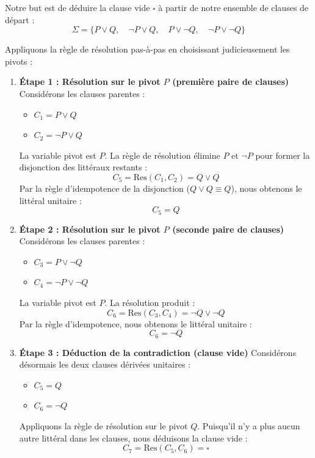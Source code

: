 \documentclass[11pt,a4paper]{article}
\begin{document}
Notre but est de déduire la clause vide \(\square\) à partir de notre
ensemble de clauses de départ :
\[\Sigma = \{ P \lor Q, \quad \neg P \lor Q, \quad P \lor \neg Q, \quad \neg P \lor \neg Q \}\]

Appliquons la règle de résolution pas-à-pas en choisissant
judicieusement les pivots :

\begin{enumerate}
\def\labelenumi{\arabic{enumi}.}
\item
  \textbf{Étape 1 : Résolution sur le pivot \(P\) (première paire de
  clauses)} Considérons les clauses parentes :

  \begin{itemize}
  \tightlist
  \item
    \(C_1 = P \lor Q\)
  \item
    \(C_2 = \neg P \lor Q\)
  \end{itemize}

  La variable pivot est \(P\). La règle de résolution élimine \(P\) et
  \(\neg P\) pour former la disjonction des littéraux restants :
  \[C_5 = \text{Res}(C_1, C_2) = Q \lor Q\] Par la règle d'idempotence
  de la disjonction (\(Q \lor Q \equiv Q\)), nous obtenons le littéral
  unitaire : \[C_5 = Q\]
\item
  \textbf{Étape 2 : Résolution sur le pivot \(P\) (seconde paire de
  clauses)} Considérons les clauses parentes :

  \begin{itemize}
  \tightlist
  \item
    \(C_3 = P \lor \neg Q\)
  \item
    \(C_4 = \neg P \lor \neg Q\)
  \end{itemize}

  La variable pivot est \(P\). La résolution produit :
  \[C_6 = \text{Res}(C_3, C_4) = \neg Q \lor \neg Q\] Par la règle
  d'idempotence, nous obtenons le littéral unitaire : \[C_6 = \neg Q\]
\item
  \textbf{Étape 3 : Déduction de la contradiction (clause vide)}
  Considérons désormais les deux clauses dérivées unitaires :

  \begin{itemize}
  \tightlist
  \item
    \(C_5 = Q\)
  \item
    \(C_6 = \neg Q\)
  \end{itemize}

  Appliquons la règle de résolution sur le pivot \(Q\). Puisqu'il n'y a
  plus aucun autre littéral dans les clauses, nous déduisons la clause
  vide : \[C_7 = \text{Res}(C_5, C_6) = \square\]
\end{enumerate}
\end{document}
